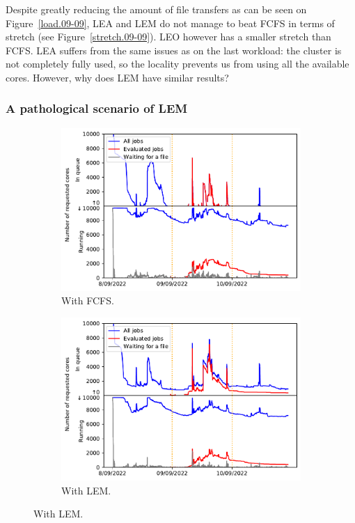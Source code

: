 \documentclass[conference,10pt]{IEEEtran}
\begin{document}
Despite greatly reducing the amount of file transfers as can be seen on Figure~\ref{load.09-09}, LEA and LEM
do not manage to beat FCFS in terms of stretch (see Figure~\ref{stretch.09-09}). 
LEO however has a smaller stretch than FCFS. 
LEA suffers from the same issues as on the last workload: the cluster is
not completely fully used, so 
the locality prevents us from using all the available cores.
However, why does LEM have similar results?

\subsubsection{A pathological scenario of LEM}

\begin{figure}[tb]
\begin{subfigure}[b]{0.49\linewidth}\centering\includegraphics[width=1\linewidth]{../MBSS/plot/Cluster_usage/2022-09-09->2022-09-09_V10000_Fcfs_Used_nodes_Reduced_450_128_32_256_4_1024_core_by_core.pdf}\caption{With FCFS.}\label{cluster_09-09_fcfs}\end{subfigure}
\begin{subfigure}[b]{0.49\linewidth}\centering\includegraphics[width=1\linewidth]{../MBSS/plot/Cluster_usage/2022-09-09->2022-09-09_V10000_Fcfs_with_a_score_mixed_strategy_x500_x1_x0_x0_Used_nodes_Reduced_450_128_32_256_4_1024_core_by_core.pdf}\caption{With LEM.}\label{cluster_09-09_lem}

\end{subfigure}
\end{figure}
\end{document}
